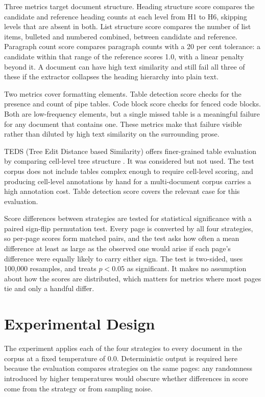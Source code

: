 Three metrics target document structure. Heading structure score compares
the candidate and reference heading counts at each level from H1 to H6,
skipping levels that are absent in both. List structure score compares the
number of list items, bulleted and numbered combined, between candidate
and reference. Paragraph
count score compares paragraph counts with a 20 per cent tolerance: a
candidate within that range of the reference scores 1.0, with a linear
penalty beyond it. A document can have high text similarity and still fail
all three of these if the extractor collapses the heading hierarchy into
plain text.

Two metrics cover formatting elements. Table detection score checks for the
presence and count of pipe tables. Code block score checks for fenced code
blocks. Both are low-frequency elements, but a single missed table is a
meaningful failure for any document that contains one. These metrics make
that failure visible rather than diluted by high text similarity on the
surrounding prose.

TEDS (Tree Edit Distance based Similarity) offers finer-grained table
evaluation by comparing cell-level tree structure \autocite{zhong2020}. It was
considered but not used. The test corpus does not include tables complex
enough to require cell-level scoring, and producing cell-level annotations
by hand for a multi-document corpus carries a high annotation cost.
Table detection score covers the relevant case for this evaluation.

Score differences between strategies are tested for statistical significance
with a paired sign-flip permutation test. Every page is converted by all four
strategies, so per-page scores form matched pairs, and the test asks how often
a mean difference at least as large as the observed one would arise if each
page's difference were equally likely to carry either sign. The test is
two-sided, uses 100{,}000 resamples, and treats $p < 0.05$ as significant.
It makes no assumption about how the scores are distributed, which matters
for metrics where most pages tie and only a handful differ.

\section{Experimental Design}

The experiment applies each of the four strategies to every document in
the corpus at a fixed temperature of 0.0. Deterministic output is
required here because the evaluation compares strategies on the same
pages: any randomness introduced by higher temperatures would obscure
whether differences in score come from the strategy or from sampling
noise.

